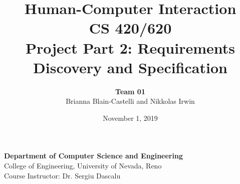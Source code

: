 \documentclass[11pt]{article}
\title{\textbf{Human-Computer Interaction} \\ \Large{CS 420/620} \\ \large{Project Part 2: Requirements Discovery and Specification} \vspace{+16ex}}
\author{\textbf{\Large Team 01} \\ \large{Brianna Blain-Castelli and Nikkolas Irwin}}
\date{\vspace{-2ex} \large{November 1, 2019}}
\begin{document}
\maketitle

\begin{center}
    \vspace{+16ex}
    {\textbf{\Large{Department of Computer Science and Engineering}} \\
    \large{College of Engineering, University of Nevada, Reno} \\
    \large{Course Instructor: Dr. Sergiu Dascalu}}
\end{center}


\newpage
{}
\tableofcontents
\newpage

\setlength{\cftfigindent}{0pt}  %
\listoffigures

\linespread{1.25}
\newpage
{}


\newpage

\newpage

\newpage

\newpage

\end{document}
